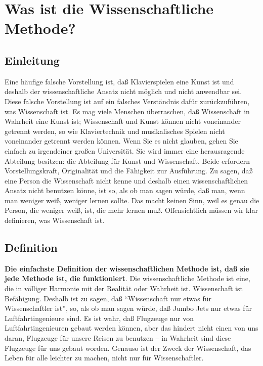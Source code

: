 
\section{Was ist die Wissenschaftliche Methode?}
\label{c3_3}

\subsection{Einleitung}
\label{c3_3a}

Eine häufige falsche Vorstellung ist, daß Klavierspielen eine Kunst ist und deshalb der wissenschaftliche Ansatz nicht möglich und nicht anwendbar sei.
Diese falsche Vorstellung ist auf ein falsches Verständnis dafür zurückzuführen, was Wissenschaft ist.
Es mag viele Menschen überraschen, daß Wissenschaft in Wahrheit eine Kunst ist; Wissenschaft und Kunst können nicht voneinander getrennt werden, so wie Klaviertechnik und musikalisches Spielen nicht voneinander getrennt werden können.
Wenn Sie es nicht glauben, gehen Sie einfach zu irgendeiner großen Universität.
Sie wird immer eine herausragende Abteilung besitzen: die Abteilung für Kunst und Wissenschaft.
Beide erfordern Vorstellungskraft, Originalität und die Fähigkeit zur Ausführung.
Zu sagen, daß eine Person die Wissenschaft nicht kenne und deshalb einen wissenschaftlichen Ansatz nicht benutzen könne, ist so, als ob man sagen würde, daß man, wenn man weniger weiß, weniger lernen sollte.
Das macht keinen Sinn, weil es genau die Person, die weniger weiß, ist, die mehr lernen muß.
Offensichtlich müssen wir klar definieren, was Wissenschaft ist.


\subsection{Definition}
\label{c3_3b}

\textbf{Die einfachste Definition der wissenschaftlichen Methode ist, daß sie jede Methode ist, die funktioniert}.
Die wissenschaftliche Methode ist eine, die in völliger Harmonie mit der Realität oder Wahrheit ist.
Wissenschaft ist Befähigung.
Deshalb ist zu sagen, daß \enquote{Wissenschaft nur etwas für Wissenschaftler ist}, so, als ob man sagen würde, daß Jumbo Jets nur etwas für Luftfahrtingenieure sind.
Es ist wahr, daß  Flugzeuge nur von Luftfahrtingenieuren gebaut werden können, aber das hindert nicht einen von uns daran, Flugzeuge für unsere Reisen zu benutzen -- in Wahrheit sind diese Flugzeuge für uns gebaut worden.
Genauso ist der Zweck der Wissenschaft, das Leben für alle leichter zu machen, nicht nur für Wissenschaftler.

